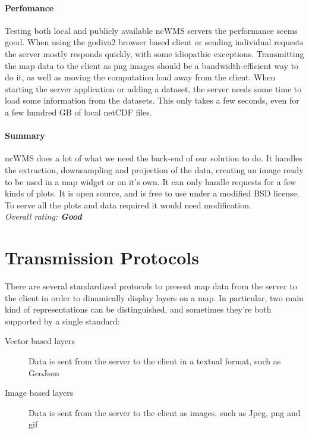 \documentclass[11pt,a4paper,titlepage,oneside]{report}
\begin{document}
    \paragraph{Perfomance}
    Testing both local and publicly available ncWMS servers the performance seems good. When using the godiva2 browser based client or sending individual requests the server mostly responds quickly, with some idiopathic exceptions. Transmitting the map data to the client as png images should be a bandwidth-efficient way to do it, as well as moving the computation load away from the client. When starting the server application or adding a dataset, the server needs some time to load some information from the datasets. This only takes a few seconds, even for a few hundred GB of local netCDF files.
    \paragraph{Summary}
    ncWMS does a lot of what we need the back-end of our solution to do. It handles the extraction, downsampling and projection of the data, creating an image ready to be used in a map widget or on it’s own. It can only handle requests for a few kinds of plots. It is open source, and is free to use under a modified BSD license. To serve all the plots and data required it would need modification.
  \\ \emph{Overall rating: \textbf{Good}}

\section{Transmission Protocols}
  There are several standardized protocols to present map data from the server to the client in order to dinamically display layers on a map.
  In particular, two main kind of representations can be distinguished, and sometimes they're both supported by a single standard:
  \begin{description}
    \item[Vector based layers] Data is sent from the server to the client in a textual format, such as GeoJson
    \item[Image based layers] Data is sent from the server to the client as images, such as Jpeg, png and gif
  \end{description}
\end{document}
